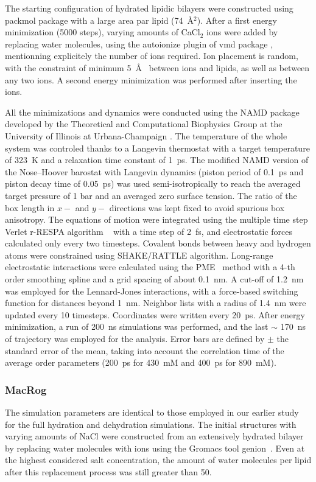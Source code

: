 \documentclass[pre,aps,floatfix,authordate1-4,twocolumn]{revtex4-1}
\begin{document}
The starting  configuration of hydrated lipidic bilayers were constructed using packmol 
package \cite{packmol} with a large area par lipid (74~\AA$^{2}$). 
After a first energy minimization (5000 steps),
varying amounts of CaCl$_2$ ions were added  by replacing water molecules,
using the autoionize plugin of vmd package \cite{hump96},
mentionning explicitely the number of ions required.
Ion placement is random, with the constraint of  minimum 5~\AA~ between ions and lipids,
as well as between any two ions. A second energy minimization was performed after inserting the ions.
 
All the minimizations and dynamics were conducted using the NAMD package developed 
by the Theoretical and Computational Biophysics Group at the University of Illinois at Urbana-Champaign \cite{NAMD}.
The temperature of the whole system was controled thanks to a Langevin  thermostat with a target temperature of 323~K 
and a relaxation time constant of 1~ps.  The modified NAMD version of the Nose–Hoover barostat with Langevin dynamics
(piston period of 0.1~ps and piston decay time of 0.05~ps) was used semi-isotropically
to reach the averaged target pressure of 1 bar and an averaged zero surface tension. 
The ratio of the box length in $x-$ and $y-$ directions was kept fixed to avoid spurious box anisotropy.
The equations of motion were integrated using the multiple time step Verlet r-RESPA algorithm ~\cite{pall13}
with a time step of 2~fs, and electrostatic forces calculated only every two timesteps. Covalent
bonds between heavy and hydrogen atoms were constrained using SHAKE/RATTLE algorithm.
Long-range electrostatic interactions were calculated using the PME~\cite{darden93,essman95} method 
with a 4-th order smoothing spline and a grid spacing of about 0.1~nm.
A cut-off of 1.2~nm was employed for the Lennard-Jones
interactions, with a force-based switching function for distances beyond 1~nm. Neighbor
lists with a radius of 1.4~nm were updated every 10 timesteps.
Coordinates were written every 20~ps. After energy minimization, a run of  200~ns simulations was performed,
and the last $\sim$ 170~ns 
of  trajectory was employed for the analysis.
Error bars are defined by $\pm$ the standard error of the mean, 
taking into account the correlation time of the average order parameters 
(200~ps for 430~mM and 400~ps for 890~mM). 


\subsubsection{MacRog}
The simulation parameters are identical to those employed in our earlier study~\cite{botan15} for the full 
hydration and dehydration simulations. The initial structures with varying amounts of NaCl were constructed from an 
extensively hydrated bilayer by replacing water molecules with ions using the Gromacs tool genion~\cite{gromacsMANUAL}. Even at the highest 
considered salt concentration, the amount of water molecules per lipid after this replacement process was still greater than 50.
\end{document}
